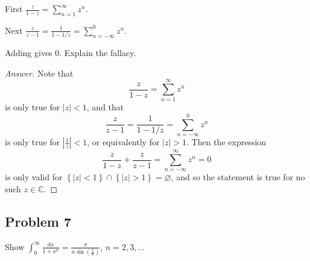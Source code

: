 \documentclass[12pt]{article}
\newcommand{\cx}{\mathbb{C}}
\newcommand\paren[1]{\left( #1 \right)}
\newcommand\setb[1]{\left \{ #1 \right \}}
\newcommand{\abs}[1]{\left| #1 \right|}
\newcommand{\ds}{\displaystyle}
\theoremstyle{definition}
\begin{document}
First $\ds \frac{z}{1-z} = \sum\limits_{n = 1}^{\infty} z^n$.

Next $\frac{z}{z-1} = \frac{1}{1-1/z} = \sum\limits_{n = -\infty}^0 z^n$.

Adding gives 0. Explain the fallacy.
\begin{proof}[Answer]
    Note that 
    \[
        \frac{z}{1-z} = \sum\limits_{n = 1}^{\infty} z^n
    \]
    is only true for $|z|<1$, and that 
    \[
        \frac{z}{z-1} = \frac{1}{1-1/z} = \sum\limits_{n = -\infty}^0 z^n
    \]
    is only true for $\abs{\frac{1}{z}} < 1$, or equivalently for $|z| > 1$. Then the expression
    \[
        \frac{z}{1-z} + \frac{z}{z-1} = \sum\limits_{n = -\infty}^{\infty} z^n = 0
    \]
    is only valid for $\setb{ |z| < 1 } \cap \setb{ |z| > 1 } = \varnothing$, and so the statement is true for no such $z \in \cx$. 
\end{proof}
\subsection{Problem 7 \texorpdfstring{\cite{Lin}}{}}
Show $\ds \int_0^{\infty} \frac{dx}{1+x^n} = \frac{\pi}{n \sin \paren{\frac{\pi}{n}}}$, $n = 2,3,\dotsc$
\end{document}
